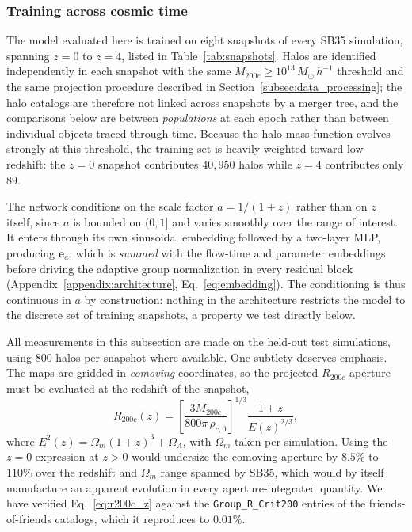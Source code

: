 \documentclass[linenumbers,trackchanges, twocolumn]{aastex701}
\begin{document}
\subsubsection{Training across cosmic time}

The model evaluated here is trained on eight snapshots of every SB35 simulation,
spanning $z = 0$ to $z = 4$, listed in Table~\ref{tab:snapshots}. Halos are
identified independently in each snapshot with the same
$M_{200c} \geq 10^{13}\,M_\odot\,h^{-1}$ threshold and the same projection
procedure described in Section~\ref{subsec:data_processing}; the halo catalogs
are therefore not linked across snapshots by a merger tree, and the comparisons
below are between \emph{populations} at each epoch rather than between individual
objects traced through time. Because the halo mass function evolves strongly at
this threshold, the training set is heavily weighted toward low redshift: the
$z = 0$ snapshot contributes $40{,}950$ halos while $z = 4$ contributes only
$89$.

The network conditions on the scale factor $a = 1/(1+z)$ rather than on $z$
itself, since $a$ is bounded on $(0, 1]$ and varies smoothly over the range of
interest. It enters through its own sinusoidal embedding followed by a two-layer
MLP, producing $\bm{e}_a$, which is \emph{summed} with the flow-time and
parameter embeddings before driving the adaptive group normalization in every
residual block (Appendix~\ref{appendix:architecture}, Eq.~\ref{eq:embedding}). The
conditioning is thus continuous in $a$ by construction: nothing in the
architecture restricts the model to the discrete set of training snapshots, a
property we test directly below.

All measurements in this subsection are made on the held-out test simulations,
using $800$ halos per snapshot where available. One subtlety deserves emphasis.
The maps are gridded in \emph{comoving} coordinates, so the projected
$R_{200c}$ aperture must be evaluated at the redshift of the snapshot,
\begin{equation}\label{eq:r200c_z}
    R_{200c}(z) = \left[\frac{3 M_{200c}}{800\pi\,\rho_{c,0}}\right]^{1/3}
                  \frac{1+z}{E(z)^{2/3}} ,
\end{equation}
where $E^2(z) = \Omega_m (1+z)^3 + \Omega_\Lambda$, with $\Omega_m$ taken per
simulation. Using the $z=0$ expression at $z>0$ would
undersize the comoving aperture by $8.5\%$ to $110\%$ over the redshift and
$\Omega_m$ range spanned by SB35, which would by itself manufacture an apparent
evolution in every aperture-integrated quantity. We have verified
Eq.~\ref{eq:r200c_z} against the \texttt{Group\_R\_Crit200} entries of the
friends-of-friends catalogs, which it reproduces to $0.01\%$.
\end{document}
